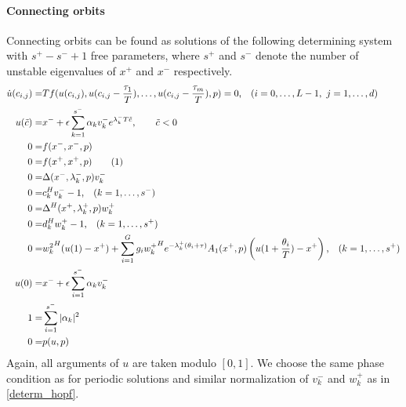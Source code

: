 \documentclass[10pt]{scrartcl}
\newcommand\numberthis{\addtocounter{equation}{1}\tag{\theequation}}
\begin{document}
{\paragraph{Connecting orbits}
Connecting orbits can be found as solutions of the following
determining system with $s^+-s^-+1$ free parameters, where $s^+$ and
$s^-$ denote the number of unstable eigenvalues of $x^+$ and $x^-$
respectively.
{\allowdisplaybreaks
\begin{align*}
  \dot{u}(c_{i,j})=& Tf(u(c_{i,j}),u(c_{i,j}-\frac{\tau_1}{T}),\ldots,
  u(c_{i,j}-\frac{\tau_m}{T}),{p})=0\mbox{,\quad}(i=0,\ldots,L-1,\ j=1,\ldots,d) \\
  u(\tilde{c})=&x^{-}+\epsilon
  \sum_{k=1}^{s^{-}}\alpha_{k}v_{k}^{-}e^{\lambda_{k}^{-}T\tilde{c}}, \qquad \tilde{c}<0\\
  0=&f(x^{-},x^{-},{p})\\
  0=&f(x^{+},x^{+},{p})\numberthis\label{determ_hcli}\\
  0=&\Delta(x^{-},\lambda_k^-,{p}) v_{k}^{-} \\
  0=&c_k^{H}v_{k}^{-}-1\mbox{,\quad} (k=1,\ldots,s^{-})\\
  0=&\Delta^{H}(x^{+},\lambda_k^+,{p})w_{k}^{+} \\
  0=&d_k^{H}w_{k}^{+}-1\mbox{,\quad} (k=1,\ldots,s^{+})\\
  0=&{w_{k}^{2}}^{H}(u(1)-x^{+})+\sum_{i=1}^{G}g_i{w_{k}^{+}}^{H}e^{-\lambda_{k}^{+}
    (\theta_i+\tau)}A_{1}(x^{+},{p})
  \left(u(1+\frac{\theta_i}{T})-x^{+}\right)\mbox{,\quad}(k=1,\ldots,s^+)\\
  u(0)=&x^{-}+\epsilon\sum_{i=1}^{s^{-}}\alpha_{k}v_{k}^{-}\\
  1=&\sum_{i=1}^{s^-}|\alpha_{k}|^{2}\\
  0=&p(u,{p})
\end{align*}
}Again, all arguments of $u$ are taken modulo $[0,1]$. We choose the
same phase condition as for periodic solutions and similar
normalization of $v_k^-$ and $w_k^+$ as in \eqref{determ_hopf}.

}
\end{document}
